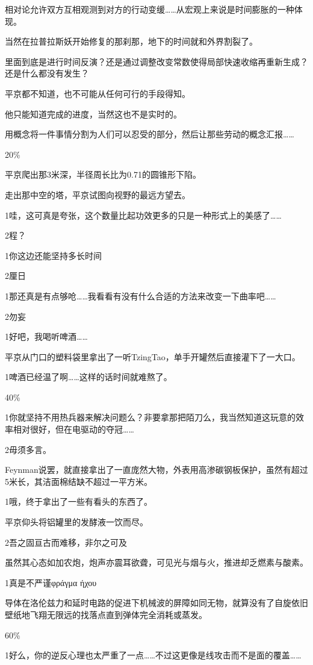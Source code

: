 \documentclass{article}
\begin{document}
相对论允许双方互相观测到对方的行动变缓……从宏观上来说是时间膨胀的一种体现。

当然在拉普拉斯妖开始修复的那刹那，地下的时间就和外界割裂了。

里面到底是进行时间反演？还是通过调整改变常数使得局部快速收缩再重新生成？还是什么都没有发生？

平京都不知道，也不可能从任何可行的手段得知。

他只能知道完成的进度，当然这也不是实时的。

用概念将一件事情分割为人们可以忍受的部分，然后让那些劳动的概念汇报……

20\%

平京爬出那3米深，半径周长比为0.71的圆锥形下陷。

走出那中空的塔，平京试图向视野的最远方望去。

1哇，这可真是夸张，这个数量比起功效更多的只是一种形式上的美感了……

2程？

1你这边还能坚持多长时间

2厘日

1那还真是有点够呛……我看看有没有什么合适的方法来改变一下曲率吧……

2勿妄

1好吧，我喝听啤酒……

平京从门口的塑料袋里拿出了一听TzingTao，单手开罐然后直接灌下了一大口。

1啤酒已经温了啊……这样的话时间就难熬了。

40\%

1你就坚持不用热兵器来解决问题么？非要拿那把陌刀么，我当然知道这玩意的效率相对很好，但在电驱动的夺冠……

2毋须多言。

Feynman说罢，就直接拿出了一直庞然大物，外表用高渗碳钢板保护，虽然有超过5米长，其洁面棉结缺不超过一平方米。

1哦，终于拿出了一些有看头的东西了。

平京仰头将铝罐里的发酵液一饮而尽。

2吾之固亘古而难移，非尔之可及

虽然其心态如加农炮，炮声亦震耳欲聋，可见光与烟与火，推进却乏燃素与酸素。

1真是不严谨φράγμα ήχου

导体在洛伦兹力和延时电路的促进下机械波的屏障如同无物，就算没有了自旋依旧壁纸地飞翔无限远的找落点直到弹体完全消耗或蒸发。

60\%

1好么，你的逆反心理也太严重了一点……不过这更像是线攻击而不是面的覆盖……
\end{document}
